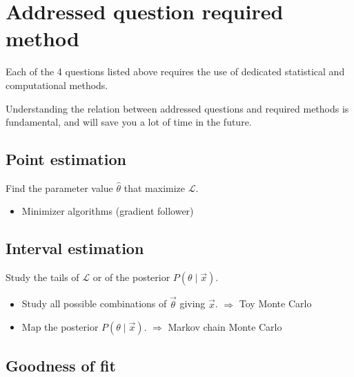 

\section{Addressed question  required method}
\label{sec:measurement_method}

Each of the 4 questions listed above requires the use of dedicated statistical and computational methods.

Understanding the relation between addressed questions and required methods is fundamental, and will save you a lot of time in the future.


\subsection{Point estimation}
\label{subsec:method_point_estimation}

Find the parameter value $\hat{\theta}$ that maximize $\mathcal{L}$.

\begin{itemize}[$\to$]
	\item Minimizer algorithms (gradient follower) 
\end{itemize}

\subsection{Interval estimation}
\label{subsec:method_interval_estimation}

Study the tails of $\mathcal{L}$ or of the posterior $P\left( \theta \mid \vec{x} \right)$.

\begin{itemize}[$\to$]
	\item Study all possible combinations of $\vec{\theta}$ giving $\vec{x}$.
		$\Rightarrow$ Toy Monte Carlo
	\item Map the posterior $P\left( \theta \mid \vec{x} \right)$.
		$\Rightarrow$ Markov chain Monte Carlo
\end{itemize}

\subsection{Goodness of fit}
\label{subsec:method_goodness_of_fit}

